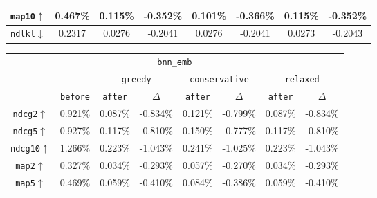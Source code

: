 \documentclass[runningheads]{llncs}
\begin{document}
\begin{table}[t]
\begin{tabular}{cccccccc}
\texttt{map10$\uparrow$}  & \multicolumn{1}{|c|}{0.467\%}     & 0.115\%     & \multicolumn{1}{c|}{-0.352\%} & 0.101\%   & \multicolumn{1}{c|}{-0.366\%}      & 0.115\%      & -0.352\%      \\ \hline \hline
\texttt{ndlkl$\downarrow$}  & \multicolumn{1}{|c|}{0.2317} & 0.0276 & \multicolumn{1}{c|}{-0.2041} & 0.0276 & \multicolumn{1}{c|}{-0.2041} & 0.0273 & -0.2043 \\ \hline
\end{tabular}
\hfill
\centering
\begin{tabular}{cccccccc}\cline{3-8} 
\multicolumn{8}{c}{\texttt{bnn\_emb}\cite{DBLP:conf/cikm/RadFKSB20,DBLP:conf/cikm/DashtiSF22}}                                                                                                                            \\ \cline{3-8} 
       &                              & \multicolumn{2}{c|}{\texttt{greedy}}             & \multicolumn{2}{c|}{\texttt{conservative}}       & \multicolumn{2}{c}{\texttt{relaxed}} \\ \cline{2-8} 
       & \multicolumn{1}{|c|}{\texttt{before}}  & \texttt{after}   & \multicolumn{1}{c|}{\texttt{\(\Delta \)}}        & \texttt{after}   & \multicolumn{1}{c|}{\texttt{\(\Delta \)}}        & \texttt{after}        & \texttt{\(\Delta \)}            \\ \hline \hline
\texttt{ndcg2$\uparrow$}  & \multicolumn{1}{|c|}{0.921\%} & 0.087\% & \multicolumn{1}{c|}{-0.834\%} & 0.121\% & \multicolumn{1}{c|}{-0.799\%} & 0.087\%      & -0.834\%     \\
\texttt{ndcg5$\uparrow$}  & \multicolumn{1}{|c|}{0.927\%} & 0.117\% & \multicolumn{1}{c|}{-0.810\%} & 0.150\% & \multicolumn{1}{c|}{-0.777\%} & 0.117\%      & -0.810\%     \\
\texttt{ndcg10$\uparrow$} & \multicolumn{1}{|c|}{1.266\%} & 0.223\% & \multicolumn{1}{c|}{-1.043\%} & 0.241\% & \multicolumn{1}{c|}{-1.025\%} & 0.223\%      & -1.043\%     \\ \hline
\texttt{map2$\uparrow$}   & \multicolumn{1}{|c|}{0.327\%} & 0.034\% & \multicolumn{1}{c|}{-0.293\%} & 0.057\% & \multicolumn{1}{c|}{-0.270\%} & 0.034\%      & -0.293\%     \\
\texttt{map5$\uparrow$}   & \multicolumn{1}{|c|}{0.469\%} & 0.059\% & \multicolumn{1}{c|}{-0.410\%} & 0.084\% & \multicolumn{1}{c|}{-0.386\%} & 0.059\%      & -0.410\%     \\

\end{tabular}
\end{table}
\end{document}
